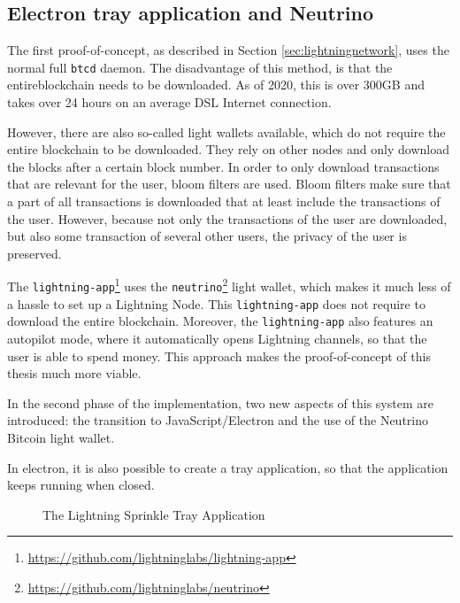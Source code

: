 \subsection{Electron tray application and Neutrino}
\label{sec:electron}
The first proof-of-concept, as described in Section \ref{sec:lightningnetwork}, uses the normal full \texttt{btcd} daemon. The disadvantage of this method, is that the entireblockchain needs to be downloaded. As of 2020, this is over 300GB and takes over 24 hours on an average DSL Internet connection. 

However, there are also so-called light wallets available, which do not require the entire blockchain to be downloaded. They rely on other nodes and only download the blocks after a certain block number. In order to only download transactions that are relevant for the user, bloom filters are used. Bloom filters make sure that a part of all transactions is downloaded that at least include the transactions of the user. However, because not only the transactions of the user are downloaded, but also some transaction of several other users, the privacy of the user is preserved.

The \texttt{lightning-app}\footnote{\url{https://github.com/lightninglabs/lightning-app}} uses the \texttt{neutrino}\footnote{\url{https://github.com/lightninglabs/neutrino}} light wallet, which makes it much less of a hassle to set up a Lightning Node. This \texttt{lightning-app} does not require to download the entire blockchain. Moreover, the \texttt{lightning-app} also features an autopilot mode, where it automatically opens Lightning channels, so that the user is able to spend money. This approach makes the proof-of-concept of this thesis much more viable. 

In the second phase of the implementation, two new aspects of this system are introduced: the transition to JavaScript/Electron and the use of the Neutrino Bitcoin light wallet.

In electron, it is also possible to create a tray application, so that the application keeps running when closed. 


\begin{figure}[h!]
  \setlength{\fboxsep}{0pt}%
  \center
  \caption{The Lightning Sprinkle Tray Application}
\end{figure}

